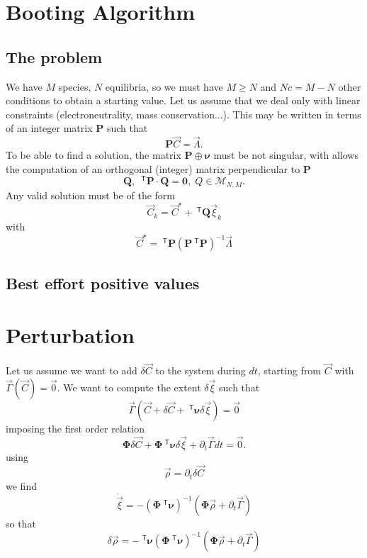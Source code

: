 \documentclass[aps]{revtex4}
\newcommand{\mymat}[1]{\bm{#1}}
\newcommand{\mytrn}[1]{~^{\mathsf{T}}{#1}}
\begin{document}
\section{Booting Algorithm}
\subsection{The problem}
We have $M$ species, $N$ equilibria, 
so we must have $M\geq N$ and $Nc=M-N$ other conditions
to obtain a starting value.
Let us assume that we deal only with linear constraints (electroneutrality, mass conservation...).
This may be written in terms of an integer matrix $\mymat{P}$
such that
$$
	\mymat{P}\vec{C} = \vec{\Lambda}.
$$
To be able to find a solution, the matrix $\mymat{P}\oplus\mymat{\nu}$ must
be not singular, with allows the computation of an orthogonal (integer) matrix perpendicular to $\mymat{P}$
$$
	\mymat{Q},\;\mytrn{\mymat{P}}\cdot\mymat{Q} = \mymat{0},\;Q\in\mathcal{M}_{N,M}.
$$
Any valid solution must be of the form
$$
	\vec{C}_k = \vec{C}^\star + \mytrn{\mymat{Q}}\vec{\xi}_k
$$
with
$$
	\vec{C}^\star = \mytrn{\mymat{P}}\left(\mymat{P}\mytrn{\mymat{P}}\right)^{-1} \vec{\Lambda}
$$
\subsection{Best effort positive values}

\section{Perturbation}
Let us assume we want to add $\delta\vec{C}$ to the system during $dt$, starting
from $\vec{C}$ with $\vec{\Gamma}(\vec{C})=\vec{0}$.
We want to compute the extent $\delta\vec{\xi}$ such that
$$
	\vec{\Gamma}\left(\vec{C}+\delta\vec{C} + \mytrn{\mymat{\nu}}\delta\vec{\xi}\right)=\vec{0}
$$
imposing the first order relation
$$
	\mymat{\Phi}\delta\vec{C} + \mymat{\Phi}\mytrn{\mymat{\nu}} \delta\vec{\xi}
	+\partial_t \vec{\Gamma} dt = \vec{0}.
$$
using 
$$
	\vec{\rho} = \partial_t \delta\vec{C}
$$
we find
$$
	\dot{\vec{\xi}} = - \left(\mymat{\Phi}\mytrn{\mymat{\nu}}\right)^{-1}
	\left(
		\mymat{\Phi}\vec{\rho} + \partial_t \vec{\Gamma}
	\right)
$$
so that 
$$
	\delta\vec{\rho} = - \mytrn{\mymat{\nu}} \left(\mymat{\Phi}\mytrn{\mymat{\nu}}\right)^{-1}
	\left(
		\mymat{\Phi}\vec{\rho} + \partial_t \vec{\Gamma}
	\right)
$$
\end{document}
